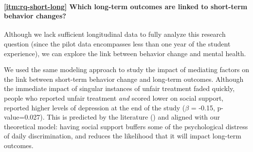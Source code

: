 \paragraph{\ref{itm:rq-short-long} Which long-term outcomes are linked to short-term behavior changes?}
Although we lack sufficient longitudinal data to fully analyze this research question (since the pilot data encompasses less than one year of the student experience), we can explore the link between behavior change and mental health. 

We used the same modeling approach to study the impact of mediating factors on the link between short-term behavior change and long-term outcomes. Although the immediate impact of singular instances of unfair treatment faded quickly, people who reported unfair treatment \textit{and} scored lower on social support, reported higher levels of depression at the end of the study ($\beta$ = -0.15, p-value=0.027). This is predicted by the literature  (\eg \cite{Mossakowski:2014}) and aligned with our theoretical model: having social support buffers some of the psychological distress of daily discrimination, and reduces the likelihood that it will impact long-term outcomes.


